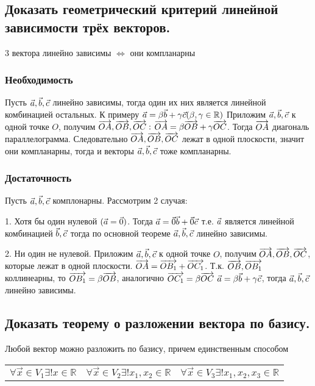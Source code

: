 \subsection{Доказать геометрический критерий линейной зависимости трёх векторов.}

3 вектора линейно зависимы $\iff$ они компланарны

\subsubsection{Необходимость}

Пусть $\vec{a}, \vec{b}, \vec{c}$ линейно зависимы, тогда один их них является линейной комбинацией
остальных. К примеру $\vec{a} = \beta\vec{b} + \gamma\vec{c} (\beta,\gamma \in \mathbb{R})$
Приложим $\vec{a}, \vec{b}, \vec{c}$ к одной точке $O$, получим $\overrightarrow{OA}, \overrightarrow{OB}, \overrightarrow{OC}:$
$\overrightarrow{OA} = \beta\overrightarrow{OB} + \gamma\overrightarrow{OC}$. Тогда $\overrightarrow{OA}$ диагональ параллелограмма.
Следовательно $\overrightarrow{OA}, \overrightarrow{OB}, \overrightarrow{OC}$ лежат в одной плоскости, значит они компланарны,
тогда и векторы $\vec{a}, \vec{b}, \vec{c}$ тоже компланарны.

\subsubsection{Достаточность}

Пусть $\vec{a}, \vec{b}, \vec{c}$ комплонарны. Рассмотрим 2 случая:

1. Хотя бы один нулевой $(\vec{a} = \vec{0})$. Тогда $\vec{a} = \vec{0}\vec{b} + \vec{0}\vec{c}$
т.е. $\vec{a}$ является линейной комбинацией $\vec{b}, \vec{c}$ тогда по основной теореме
$\vec{a}, \vec{b}, \vec{c}$ линейно зависимы. 

2. Ни один не нулевой. Приложим $\vec{a}, \vec{b}, \vec{c}$ к одной точке $O$, 
получим $\overrightarrow{OA}, \overrightarrow{OB}, \overrightarrow{OC}$, которые лежат в одной плоскости.
$\overrightarrow{OA} = \overrightarrow{OB_1} + \overrightarrow{OC_1}$. Т.к. $\overrightarrow{OB}, \overrightarrow{OB_1}$ коллинеарны, то
$\overrightarrow{OB_1} = \beta\overrightarrow{OB}$, аналогично $\overrightarrow{OC_1} = \beta\overrightarrow{OC}$ 
$\vec{a} = \beta\vec{b} + \gamma\vec{c}$, тогда $\vec{a}, \vec{b}, \vec{c}$ линейно зависимы.

\subsection{Доказать теорему о разложении вектора по базису.}

\begin{center}
Любой вектор можно разложить по базису, причем единственным способом
\begin{tabular}{c c c} 
    $\forall \vec{x} \in V_1 \exists ! x \in \mathbb{R}$&
    $\forall \vec{x} \in V_2 \exists ! x_1, x_2 \in \mathbb{R}$&
    $\forall \vec{x} \in V_3 \exists ! x_1, x_2, x_3 \in \mathbb{R}$\\
\end{tabular}
\end{center}


